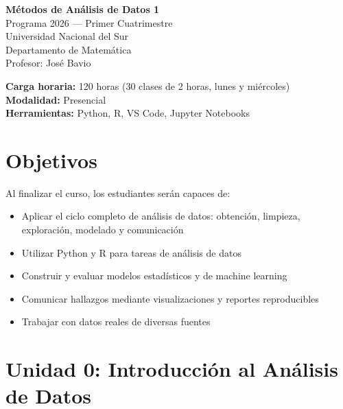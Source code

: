 \documentclass[a4paper,11pt]{article}
\begin{document}
\begin{center}
    {\LARGE \textbf{Métodos de Análisis de Datos 1}}\\[0.5em]
    {\large Programa 2026 --- Primer Cuatrimestre}\\[0.3em]
    {\normalsize Universidad Nacional del Sur}\\[0.3em]
    {\normalsize Departamento de Matemática}\\[0.3em]
    {\normalsize Profesor: José Bavio}
\end{center}

\vspace{1em}

\noindent\textbf{Carga horaria:} 120 horas (30 clases de 2 horas, lunes y miércoles)\\
\textbf{Modalidad:} Presencial\\
\textbf{Herramientas:} Python, R, VS Code, Jupyter Notebooks

\vspace{1em}

\section*{Objetivos}

Al finalizar el curso, los estudiantes serán capaces de:
\begin{itemize}[leftmargin=*]
    \item Aplicar el ciclo completo de análisis de datos: obtención, limpieza, exploración, modelado y comunicación
    \item Utilizar Python y R para tareas de análisis de datos
    \item Construir y evaluar modelos estadísticos y de machine learning
    \item Comunicar hallazgos mediante visualizaciones y reportes reproducibles
    \item Trabajar con datos reales de diversas fuentes
\end{itemize}

\vspace{1em}
\setcounter{section}{-1}

\section{Unidad 0: Introducción al Análisis de Datos}
\end{document}
